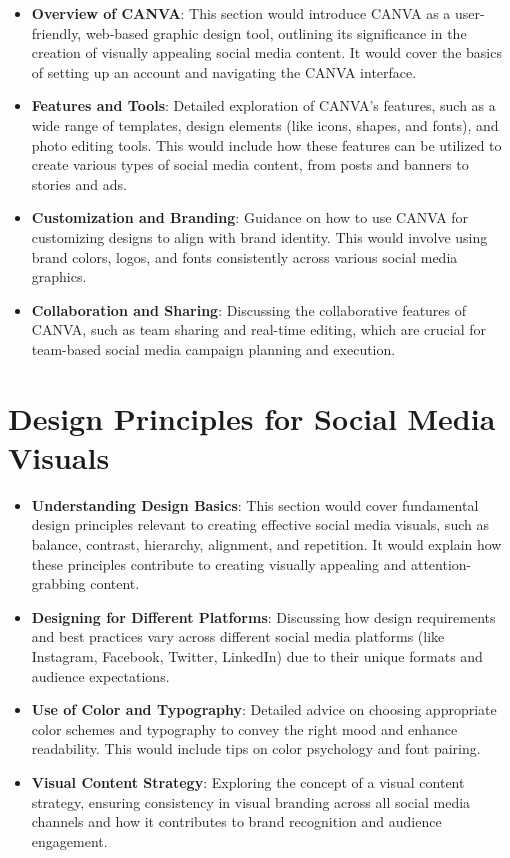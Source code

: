 \documentclass[
]{book}
\providecommand{\tightlist}{%
  \setlength{\itemsep}{0pt}\setlength{\parskip}{0pt}}
\begin{document}
\begin{itemize}
\tightlist
\item
  \textbf{Overview of CANVA}: This section would introduce CANVA as a user-friendly, web-based graphic design tool, outlining its significance in the creation of visually appealing social media content. It would cover the basics of setting up an account and navigating the CANVA interface.
\item
  \textbf{Features and Tools}: Detailed exploration of CANVA's features, such as a wide range of templates, design elements (like icons, shapes, and fonts), and photo editing tools. This would include how these features can be utilized to create various types of social media content, from posts and banners to stories and ads.
\item
  \textbf{Customization and Branding}: Guidance on how to use CANVA for customizing designs to align with brand identity. This would involve using brand colors, logos, and fonts consistently across various social media graphics.
\item
  \textbf{Collaboration and Sharing}: Discussing the collaborative features of CANVA, such as team sharing and real-time editing, which are crucial for team-based social media campaign planning and execution.
\end{itemize}

\hypertarget{design-principles-for-social-media-visuals}{%
\section*{Design Principles for Social Media Visuals}\label{design-principles-for-social-media-visuals}}

\begin{itemize}
\tightlist
\item
  \textbf{Understanding Design Basics}: This section would cover fundamental design principles relevant to creating effective social media visuals, such as balance, contrast, hierarchy, alignment, and repetition. It would explain how these principles contribute to creating visually appealing and attention-grabbing content.
\item
  \textbf{Designing for Different Platforms}: Discussing how design requirements and best practices vary across different social media platforms (like Instagram, Facebook, Twitter, LinkedIn) due to their unique formats and audience expectations.
\item
  \textbf{Use of Color and Typography}: Detailed advice on choosing appropriate color schemes and typography to convey the right mood and enhance readability. This would include tips on color psychology and font pairing.
\item
  \textbf{Visual Content Strategy}: Exploring the concept of a visual content strategy, ensuring consistency in visual branding across all social media channels and how it contributes to brand recognition and audience engagement.
\end{itemize}
\end{document}
